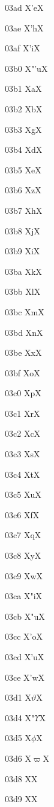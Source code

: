 \documentclass[11pt]{article}
\begin{document}
03ad X{\textgreek{'e}}X

03ae X{\textgreek{'h}}X

03af X{\textgreek{'i}}X

03b0 X{\textgreek{"'u}}X

03b1 X{\textgreek{a}}X

03b2 X{\textgreek{b}}X

03b3 X{\textgreek{g}}X

03b4 X{\textgreek{d}}X

03b5 X{\textgreek{e}}X

03b6 X{\textgreek{z}}X

03b7 X{\textgreek{h}}X

03b8 X{\textgreek{j}}X

03b9 X{\textgreek{i}}X

03ba X{\textgreek{k}}X

03bb X{\textgreek{l}}X

03bc X{\textgreek{m}}X

03bd X{\textgreek{n}}X

03be X{\textgreek{x}}X

03bf X{\textgreek{o}}X

03c0 X{\textgreek{p}}X

03c1 X{\textgreek{r}}X

03c2 X{\textgreek{c}}X

03c3 X{\textgreek{s}}X

03c4 X{\textgreek{t}}X

03c5 X{\textgreek{u}}X

03c6 X{\textgreek{f}}X

03c7 X{\textgreek{q}}X

03c8 X{\textgreek{y}}X

03c9 X{\textgreek{w}}X

03ca X{\textgreek{"i}}X

03cb X{\textgreek{"u}}X

03cc X{\textgreek{'o}}X

03cd X{\textgreek{'u}}X

03ce X{\textgreek{'w}}X

03d1 X{\ensuremath{\vartheta}}X

03d4 X{\textgreek{"\ensuremath{\Upsilon}}}X

03d5 X{\ensuremath{\phi}}X

03d6 X{\ensuremath{\varpi}}X

03d8 X{\textgreek{\Koppa}}X

03d9 X{\textgreek{\coppa}}X
\end{document}
